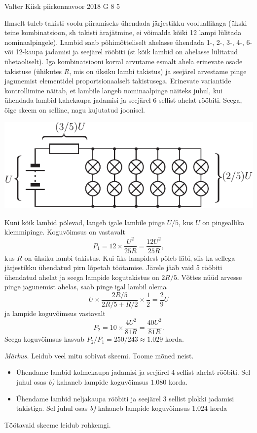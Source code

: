 \documentclass[11pt, twoside]{article}
\begin{document}
{%
{Valter Kiisk} %
{piirkonnavoor} %
{2018} %
{G 8} %
{5} %
{

\ifSolution
\osa Ilmselt tuleb takisti voolu piiramiseks ühendada järjestikku vooluallikaga (ükski teine kombinatsioon, sh takisti ärajätmine, ei võimalda kõiki 12 lampi lülitada nominaalpingele). Lambid saab põhimõtteliselt ahelasse ühendada 1-, 2-, 3-, 4-, 6- või 12-kaupa jadamisi ja seejärel rööbiti (st kõik lambid on ahelasse lülitatud ühetaoliselt). Iga kombinatsiooni korral arvutame esmalt ahela erinevate osade takistuse (ühikutes $R$, mis on üksiku lambi takistus) ja seejärel arvestame pinge jagunemist elementidel proportsionaalselt takistusega. Erinevate variantide kontrollimine näitab, et lambile langeb nominaalpinge näiteks juhul, kui ühendada lambid kahekaupa jadamisi ja seejärel 6 sellist ahelat rööbiti. Seega, õige skeem on selline, nagu kujutatud joonisel.

\begin{center}
\includegraphics{2018-v2g-08-lambid-joonis.pdf}
\end{center}

Kuni kõik lambid põlevad, langeb igale lambile pinge $U/5$, kus $U$ on pingeallika klemmipinge. Koguvõimsus on vastavalt
\[
P_1=12\times \frac{U^2}{25R}=\frac{12U^2}{25R},
\]
kus $R$ on üksiku lambi takistus. Kui üks lampidest põleb läbi, siis ka sellega järjestikku ühendatud pirn lõpetab töötamise. Järele jääb vaid 5 rööbiti ühendatud ahelat ja seega lampide kogutakistus on $2R/5$. Võttes nüüd arvesse pinge jagunemist ahelas, saab pinge igal lambil olema
\[
U\times \frac{2R/5}{2R/5+R/2} \times \frac{1}{2}=\frac{2}{9}U
\]
ja lampide koguvõimsus vastavalt
\[
P_2=10\times \frac{4U^2}{81R}=\frac{40U^2}{81R}.
\]
Seega koguvõimsus kasvab $P_2/P_1=250/243\approx \num{1.029}$ korda.

\textit{Märkus.} Leidub veel mitu sobivat skeemi. Toome mõned neist.
\begin{itemize} 
\item
Ühendame lambid kolmekaupa jadamisi ja seejärel 4 sellist ahelat rööbiti. Sel juhul osas \textit{b)} kahaneb lampide koguvõimsus $\num{1.080}$ korda.
\item
Ühendame lambid neljakaupa rööbiti ja seejärel 3 sellist plokki jadamisi takistiga. Sel juhul osas \textit{b)} kahaneb lampide koguvõimsus $\num{1.024}$ korda
\end{itemize}
Töötavaid skeeme leidub rohkemgi.
\fi
}

}
\end{document}
